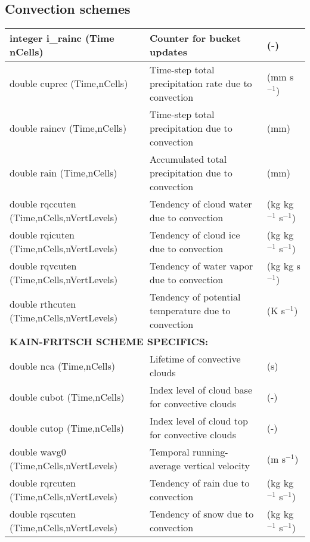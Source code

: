 \subsection{Convection schemes}

{\small
\begin{longtable}{|p{2.0in} |p{3.0in} |p{1.0in} |}
\hline
        integer i\_rainc (Time nCells) & Counter for bucket updates & (-) \\ \hline
        double cuprec (Time,nCells) & Time-step total precipitation rate due to convection & (mm s$^{-1}$) \\ \hline
        double raincv (Time,nCells)  & Time-step total precipitation due to convection & (mm) \\ \hline
        double rain (Time,nCells)      & Accumulated total precipitation due to convection & (mm) \\ \hline
        double rqccuten \hfil\break (Time,nCells,nVertLevels) & Tendency of cloud water due to convection &  (kg kg$^{-1}$ s$^{-1}$) \\ \hline
        double rqicuten \hfil\break (Time,nCells,nVertLevels) & Tendency of cloud ice due to convection & (kg kg$^{-1}$ s$^{-1}$) \\ \hline
        double rqvcuten \hfil\break (Time,nCells,nVertLevels) & Tendency of water vapor due to convection & (kg kg s$^{-1}$) \\ \hline
        double rthcuten \hfil\break (Time,nCells,nVertLevels) & Tendency of potential temperature due to convection & (K s$^{-1}$) \\ \hline
        \multicolumn{3}{|l|}{{\rule[-3mm]{0mm}{8mm}\bf KAIN-FRITSCH SCHEME SPECIFICS:} \hfill}\\ \hline
         double nca (Time,nCells) & Lifetime of convective clouds & (s) \\ \hline
        double cubot (Time,nCells) & Index level of cloud base for convective clouds & (-) \\ \hline
        double cutop (Time,nCells) & Index level of cloud top for convective clouds & (-) \\ \hline
        double wavg0 \hfil\break (Time,nCells,nVertLevels) & Temporal running-average vertical velocity & (m s$^{-1}$) \\ \hline
        double rqrcuten \hfil\break (Time,nCells,nVertLevels) & Tendency of rain due to convection &  (kg kg$^{-1}$ s$^{-1}$) \\ \hline
        double rqscuten \hfil\break (Time,nCells,nVertLevels) & Tendency of snow due to convection & (kg kg$^{-1}$ s$^{-1}$) \\ \hline

\end{longtable}}
